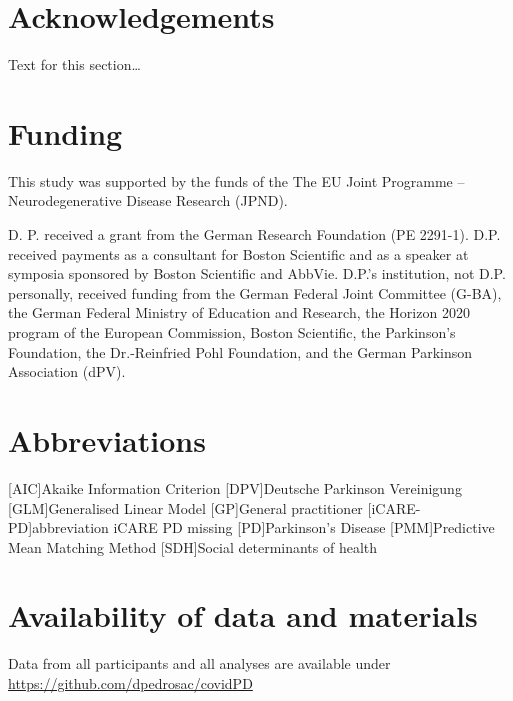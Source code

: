 \documentclass{bmcart}
\begin{document}
	
	\begin{backmatter}
		
		\section*{Acknowledgements}%
		Text for this section\ldots
		
\section*{Funding}%
This study was supported by the funds of the The EU Joint Programme – Neurodegenerative Disease Research (JPND).

D. P. received a grant from the German Research Foundation (PE 2291-1). D.P. received payments as a consultant for Boston Scientific and as a speaker at symposia sponsored by Boston Scientific and AbbVie. D.P.'s institution, not D.P. personally, received funding from the German Federal Joint Committee (G-BA), the German Federal Ministry of Education and Research, the Horizon 2020 program of the European Commission, Boston Scientific, the Parkinson’s Foundation, the Dr.-Reinfried Pohl Foundation, and the German Parkinson Association (dPV).
		
\section*{Abbreviations}
\begin{acronym}[ECU]
[AIC]{Akaike Information Criterion}
[DPV]{Deutsche Parkinson Vereinigung}
[GLM]{Generalised Linear Model}
[GP]{General practitioner}
[iCARE-PD]{abbreviation iCARE PD missing}
[PD]{Parkinson's Disease}
[PMM]{Predictive Mean Matching Method}
[SDH]{Social determinants of health}
\end{acronym}		

\section*{Availability of data and materials}
Data from all participants and all analyses are available under \url{https://github.com/dpedrosac/covidPD}
		

\end{backmatter}
\end{document}
